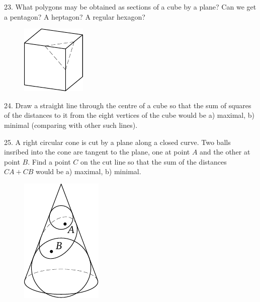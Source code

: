 \begin{problem}{23.}
	What polygons may be obtained as sections of a cube by a plane? Can we get a pentagon? A heptagon?
	A regular hexagon?
	\begin{figure}
		\includegraphics{taskbook-7}
	\end{figure}
\end{problem}

\begin{problem}{24.}
	Draw a straight line through the centre of a cube so that the sum of squares of the distances to it
	from the eight vertices of the cube would be
	a) maximal,
	b) minimal (comparing with other such lines).
\end{problem}

\begin{problem}{25.}
	A right circular cone is cut by a plane along a closed curve. Two balls insribed into the cone
	are tangent to the plane, one at point $A$ and the other at point $B$. Find a point $C$ on the cut line so
	that the sum of the distances $CA + CB$ would be a) maximal, b) minimal.
	\begin{figure}
		\includegraphics{taskbook-9}
	\end{figure}
\end{problem}

